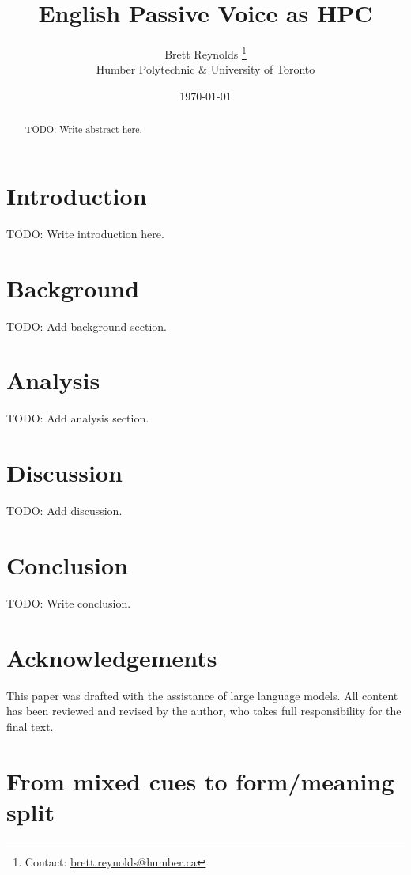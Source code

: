 \documentclass[12pt]{article}
\title{English Passive Voice as HPC}
\author{Brett Reynolds \orcidlink{0000-0003-0073-7195}%
\thanks{Contact: \href{mailto:brett.reynolds@humber.ca}{brett.reynolds@humber.ca}}\\
Humber Polytechnic \& University of Toronto}
\date{\today}
\begin{document}
\maketitle

\begin{abstract}
TODO: Write abstract here.
\end{abstract}

\section{Introduction}

TODO: Write introduction here.

\section{Background}

TODO: Add background section.

\section{Analysis}

TODO: Add analysis section.

\section{Discussion}

TODO: Add discussion.

\section{Conclusion}

TODO: Write conclusion.

\section*{Acknowledgements}

This paper was drafted with the assistance of large language models. All content has been reviewed and revised by the author, who takes full responsibility for the final text.

\newpage
\appendix

\section{From mixed cues to form/meaning split}\label{app:cue-restructuring}
\end{document}
